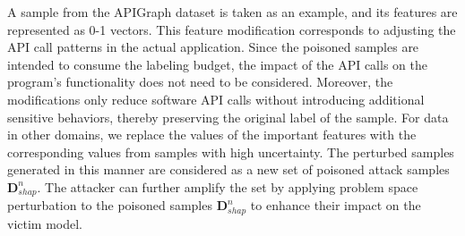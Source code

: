 A sample from the APIGraph dataset is taken as an example, and its features are represented as 0-1 vectors.
This feature modification corresponds to adjusting the API call patterns in the actual application.
Since the poisoned samples are intended to consume the labeling budget, the impact of the API calls on the program's functionality does not need to be considered.
Moreover, the modifications only reduce software API calls without introducing additional sensitive behaviors, thereby preserving the original label of the sample.
For data in other domains, we replace the values of the important features with the corresponding values from samples with high uncertainty.
The perturbed samples generated in this manner are considered as a new set of poisoned attack samples $\bm{D}_{shap}^{n}$.
The attacker can further amplify the set by applying problem space perturbation to the poisoned samples $\bm{D}_{shap}^{n}$ to enhance their impact on the victim model.